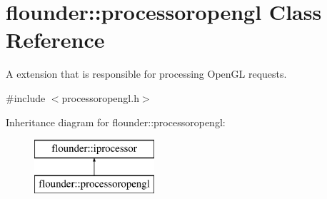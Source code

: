 \hypertarget{classflounder_1_1processoropengl}{}\section{flounder\+:\+:processoropengl Class Reference}
\label{classflounder_1_1processoropengl}


A extension that is responsible for processing Open\+GL requests.  




{\ttfamily \#include $<$processoropengl.\+h$>$}

Inheritance diagram for flounder\+:\+:processoropengl\+:\begin{figure}[H]
\begin{center}
\leavevmode
\includegraphics[height=2.000000cm]{classflounder_1_1processoropengl}
\end{center}
\end{figure}
